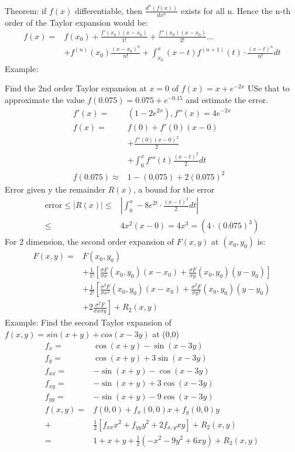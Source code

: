 \documentclass{article}
\begin{document}
        Theorem: if $f(x)$ differentiable, then $\frac{d^n(f(x))}{dx^n}$ exists for all n. Hence the n-th order of the Taylor expansion would be:
        \begin{align}
            f(x) =& f(x_0)+\frac{f'(x_0)(x-x_0)}{1!} + \frac{f''(x_0)(x-x_0)}{2!} \dots\\\nonumber
            &+ f^{(n)}(x_0)\frac{(x-x_0)^n}{n!} + \int^{x}_{x_0}(x-t)f^{(n+1)}(t)\cdot\frac{(x-t)^n}{n!}dt
        \end{align}
        Example:
        
        Find the 2nd order Taylor expansion at $x = 0$ of $f(x) = x+e^{-2x}$ USe that to approximate the value $f(0.075) = 0.075 + e^{-0.15}$ and estimate the error.
        \begin{align}
            f'(x) =& (1-2e^{2x}), f''(x) = 4e^{-2x}\\\nonumber
            f(x) =& f(0) + f'(0)(x-0)\\\nonumber
            &+ \frac{f''(0)(x-0)^2}{2}\\\nonumber
            &+ \int^{x}_{0}f'''(t) \frac{(x-t)^2}{2}dt\\\nonumber
            f(0.075)\approx&1-(0.075)+2(0.075)^2
        \end{align}
        Error given y the remainder $R(x)$, a bound for the error
        \begin{align}
            \text{error}\leq|R(x)| \leq& \left|\int^{x}_{0}-8e^{2t}\cdot\frac{(x-t)^2}{2}dt\right|\\
            \leq& 4x^2 (x-0) = 4x^3 = (4\cdot(0.075)^3)
        \end{align}
        For 2 dimension, the second order expansion of $F(x,y)$ at $(x_0,y_0)$ is:
        \begin{align}
            F(x,y) =& F(x_0,y_0) \\\nonumber
            &+ \frac{1}{1!}\left[\frac{\sigma F}{\sigma x}(x_0,y_0)(x-x_0) + \frac{\sigma F}{\sigma y}(x_0,y_0)(y-y_0)\right]\\\nonumber
            &+ \frac{1}{2!}\left[\frac{\sigma^2 F}{\sigma x^2}(x_0,y_0)(x-x_0) + \frac{\sigma^2 F}{\sigma y^2}(x_0,y_0)(y-y_0)\right.\\\nonumber
            &+ \left. 2\frac{\sigma ^2 F}{\sigma x\sigma y}\right] + R_2(x,y)
        \end{align}
        Example: Find the second Taylor expansion of $f(x,y) = sin(x+y) + cos(x-3y)$ at (0,0)
        \begin{align}
            f_x =& \cos(x+y)-\sin(x-3y)\\
            f_y =& \cos(x+y)+3\sin(x-3y)\\
            f_{xx} =& -\sin(x+y) - \cos(x-3y)\\
            f_{xy} =& -\sin(x+y) + 3\cos(x-3y)\\
            f_{yy} =& -\sin(x+y) - 9\cos(x-3y)\\
            f(x,y) =& f(0,0) + f_x(0,0)x + f_y(0,0)y\\
            +& \frac{1}{2}\left[f_{xx}x^2 + f_{yy}y^2 + 2f_{x,y}xy\right] + R_2(x,y)\\
            =& 1 + x + y + \frac{1}{2}(-x^2 - 9y^2 + 6xy) + R_2(x,y)
        \end{align}
\end{document}
